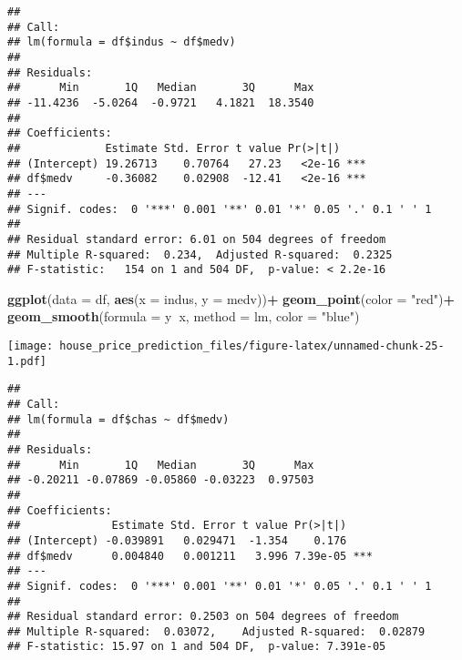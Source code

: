 \documentclass[
]{article}
\newenvironment{Shaded}{\begin{snugshade}}{\end{snugshade}}
\newcommand{\DataTypeTok}[1]{\textcolor[rgb]{0.13,0.29,0.53}{#1}}
\newcommand{\KeywordTok}[1]{\textcolor[rgb]{0.13,0.29,0.53}{\textbf{#1}}}
\newcommand{\NormalTok}[1]{#1}
\newcommand{\OperatorTok}[1]{\textcolor[rgb]{0.81,0.36,0.00}{\textbf{#1}}}
\newcommand{\StringTok}[1]{\textcolor[rgb]{0.31,0.60,0.02}{#1}}
\begin{document}
\begin{verbatim}
## 
## Call:
## lm(formula = df$indus ~ df$medv)
## 
## Residuals:
##      Min       1Q   Median       3Q      Max 
## -11.4236  -5.0264  -0.9721   4.1821  18.3540 
## 
## Coefficients:
##             Estimate Std. Error t value Pr(>|t|)    
## (Intercept) 19.26713    0.70764   27.23   <2e-16 ***
## df$medv     -0.36082    0.02908  -12.41   <2e-16 ***
## ---
## Signif. codes:  0 '***' 0.001 '**' 0.01 '*' 0.05 '.' 0.1 ' ' 1
## 
## Residual standard error: 6.01 on 504 degrees of freedom
## Multiple R-squared:  0.234,  Adjusted R-squared:  0.2325 
## F-statistic:   154 on 1 and 504 DF,  p-value: < 2.2e-16
\end{verbatim}

\begin{Shaded}
\begin{Highlighting}[]
\KeywordTok{ggplot}\NormalTok{(}\DataTypeTok{data =}\NormalTok{ df, }\KeywordTok{aes}\NormalTok{(}\DataTypeTok{x =}\NormalTok{ indus, }\DataTypeTok{y =}\NormalTok{ medv))}\OperatorTok{+}
\StringTok{  }\KeywordTok{geom_point}\NormalTok{(}\DataTypeTok{color =} \StringTok{"red"}\NormalTok{)}\OperatorTok{+}
\StringTok{  }\KeywordTok{geom_smooth}\NormalTok{(}\DataTypeTok{formula =}\NormalTok{ y}\OperatorTok{~}\NormalTok{x, }\DataTypeTok{method =}\NormalTok{ lm, }\DataTypeTok{color =} \StringTok{"blue"}\NormalTok{)}
\end{Highlighting}
\end{Shaded}

\texttt{[image: house\_price\_prediction\_files/figure-latex/unnamed-chunk-25-1.pdf]}

\begin{Shaded}
\end{Shaded}

\begin{verbatim}
## 
## Call:
## lm(formula = df$chas ~ df$medv)
## 
## Residuals:
##      Min       1Q   Median       3Q      Max 
## -0.20211 -0.07869 -0.05860 -0.03223  0.97503 
## 
## Coefficients:
##              Estimate Std. Error t value Pr(>|t|)    
## (Intercept) -0.039891   0.029471  -1.354    0.176    
## df$medv      0.004840   0.001211   3.996 7.39e-05 ***
## ---
## Signif. codes:  0 '***' 0.001 '**' 0.01 '*' 0.05 '.' 0.1 ' ' 1
## 
## Residual standard error: 0.2503 on 504 degrees of freedom
## Multiple R-squared:  0.03072,    Adjusted R-squared:  0.02879 
## F-statistic: 15.97 on 1 and 504 DF,  p-value: 7.391e-05
\end{verbatim}
\end{document}
